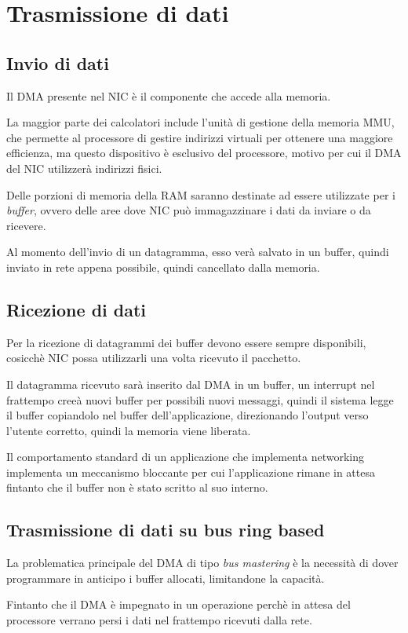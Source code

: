 \section{Trasmissione di dati}
\subsection{Invio di dati}
Il DMA presente nel NIC è il componente che accede alla memoria.

La maggior parte dei calcolatori include l'unità di gestione della memoria MMU,
che permette al processore di gestire indirizzi virtuali per ottenere una
maggiore efficienza, ma questo dispositivo è esclusivo del processore, motivo
per cui il DMA del NIC utilizzerà indirizzi fisici.

Delle porzioni di memoria della RAM saranno destinate ad essere utilizzate per
i \emph{buffer}, ovvero delle aree dove NIC può immagazzinare i dati da inviare
o da ricevere.

Al momento dell'invio di un datagramma, esso verà salvato in un buffer, quindi
inviato in rete appena possibile, quindi cancellato dalla memoria.

\subsection{Ricezione di dati}
Per la ricezione di datagrammi dei buffer devono essere sempre disponibili,
cosicchè NIC possa utilizzarli una volta ricevuto il pacchetto.

Il datagramma ricevuto sarà inserito dal DMA in un buffer, un interrupt nel
frattempo creeà nuovi buffer per possibili nuovi messaggi, quindi il sistema
legge il buffer copiandolo nel buffer dell'applicazione, direzionando l'output
verso l'utente corretto, quindi la memoria viene liberata.

Il comportamento standard di un applicazione che implementa networking 
implementa un meccanismo bloccante per cui l'applicazione rimane in attesa
fintanto che il buffer non è stato scritto al suo interno.

\subsection{Trasmissione di dati su bus ring based}
La problematica principale del DMA di tipo \emph{bus mastering} è la
necessità di dover programmare in anticipo i buffer allocati, limitandone
la capacità.

Fintanto che il DMA è impegnato in un operazione perchè in attesa del
processore verrano persi i dati nel frattempo ricevuti dalla rete.

